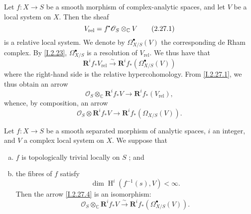 \documentclass{report}
\theoremstyle{plain}
\newenvironment{proposition}[1]
    {\renewcommand\theinnercustomproposition{#1}\innercustomproposition}
    {\endinnercustomproposition}
\theoremstyle{definition}
\newenvironment{env}[1]
    {\renewcommand\theinnercustomenv{#1}\innercustomenv}
    {\endinnercustomenv}
\newcommand{\sh}{\mathscr}
\newcommand{\sbullet}{{\mathbin{\vcenter{\hbox{\scalebox{.5}{$\bullet$}}}}}}
\newcommand{\CC}{\mathbb{C}}
\newcommand{\RR}{\mathbf{R}}
\DeclareMathOperator{\HH}{H}
\newcommand{\oldpage}[1]{\marginpar{\footnotesize$\Big\vert$ \textit{p.~#1}}}
\begin{document}
\begin{env}{2.27}
\label{I.2.27}
  Let $f\colon X\to S$ be a smooth morphism of complex-analytic spaces, and let $V$ be a local system on $X$.
  Then the sheaf
\oldpage{20}
  \[
  \label{I.2.27.1}
    V_\mathrm{rel} = f^\sbullet\sh{O}_S \otimes_\CC V
  \tag{2.27.1}
  \]
  is a relative local system.
  We denote by $\Omega_{X/S}^\bullet(V)$ the corresponding de Rham complex.
  By \cref{I.2.23}, $\Omega_{X/S}^\bullet$ is a resolution of $V_\mathrm{rel}$.
  We thus have that
  \[
  \label{I.2.27.2}
    \RR^i f_* V_\mathrm{rel} \xrightarrow{\sim} \RR^i f_*(\Omega_{X/S}^\bullet(V))
  \tag{2.27.2}
  \]
  where the right-hand side is the relative hypercohomology.
  From \cref{I.2.27.1}, we thus obtain an arrow
  \[
  \label{I.2.27.3}
    \sh{O}_S \otimes_\CC \RR^i f_*V \to \RR^i f_*(V_\mathrm{rel}),
  \tag{2.27.3}
  \]
  whence, by composition, an arrow
  \[
  \label{I.2.27.4}
    \sh{O}_S \otimes \RR^i f_*V \to \RR^i f_*(\Omega_{X/S}(V)).
  \tag{2.27.4}
  \]
\end{env}

\begin{proposition}{2.28}
\label{I.2.28}
  Let $f\colon X\to S$ be a smooth separated morphism of analytic spaces, $i$ an integer, and $V$ a complex local system on $X$.
  We suppose that
  \begin{enumerate}[a)]
    \item $f$ is topologically trivial locally on $S$ ; and
    \item the fibres of $f$ satisfy
      \[
        \dim\HH^i(f^{-1}(s),V) < \infty.
      \]
      Then the arrow \cref{I.2.27.4} is an isomorphism:
      \[
        \sh{O}_S \otimes_\CC \RR^i f_*V \xrightarrow{\sim} \RR^i f_*(\Omega_{X/S}^\bullet(V)).
      \]
  \end{enumerate}
\end{proposition}
\end{document}
